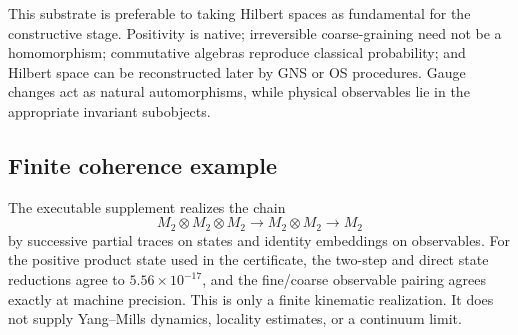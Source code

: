 This substrate is preferable to taking Hilbert spaces as fundamental for the
constructive stage.  Positivity is native; irreversible coarse-graining need
not be a homomorphism; commutative algebras reproduce classical probability;
and Hilbert space can be reconstructed later by GNS or OS procedures.  Gauge
changes act as natural automorphisms, while physical observables lie in the
appropriate invariant subobjects.

\subsection{Finite coherence example}

The executable supplement realizes the chain
\begin{equation}
 M_2\otimes M_2\otimes M_2\longrightarrow M_2\otimes M_2
 \longrightarrow M_2
\end{equation}
by successive partial traces on states and identity embeddings on
observables.  For the positive product state used in the certificate, the
two-step and direct state reductions agree to
\(5.56\times10^{-17}\), and the fine/coarse observable pairing agrees exactly
at machine precision.  This is only a finite kinematic realization.  It does
not supply Yang--Mills dynamics, locality estimates, or a continuum limit.
